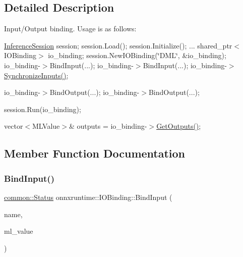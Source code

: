 \subsection{Detailed Description}
Input/\+Output binding. Usage is as follows\+:

\mbox{\hyperlink{classonnxruntime_1_1InferenceSession}{Inference\+Session}} session; session.\+Load(); session.\+Initialize(); ... shared\+\_\+ptr$<$\+I\+O\+Binding$>$ io\+\_\+binding; session.\+New\+I\+O\+Binding(\char`\"{}\+D\+M\+L\char`\"{}, \&io\+\_\+binding); io\+\_\+binding-\/$>$Bind\+Input(...); io\+\_\+binding-\/$>$Bind\+Input(...); io\+\_\+binding-\/$>$\mbox{\hyperlink{classonnxruntime_1_1IOBinding_a03022da7eb066502cae7288f13ef1625}{Synchronize\+Inputs()}};

io\+\_\+binding-\/$>$Bind\+Output(...); io\+\_\+binding-\/$>$Bind\+Output(...);

session.\+Run(io\+\_\+binding);

vector$<$\+M\+L\+Value$>$\& outputs = io\+\_\+binding-\/$>$\mbox{\hyperlink{classonnxruntime_1_1IOBinding_a2200c675c3fa6c3aa11de0847082fe33}{Get\+Outputs()}}; 

\subsection{Member Function Documentation}
\mbox{\label{classonnxruntime_1_1IOBinding_ac1217bbb8ec78b47ad58c343cdd15f7c}} 
\subsubsection{\texorpdfstring{Bind\+Input()}{BindInput()}}
{\footnotesize\ttfamily \mbox{\hyperlink{classonnxruntime_1_1common_1_1Status}{common\+::\+Status}} onnxruntime\+::\+I\+O\+Binding\+::\+Bind\+Input (\begin{DoxyParamCaption}\item[{const std\+::string \&}]{name,  }\item[{const \mbox{\hyperlink{classonnxruntime_1_1MLValue}{M\+L\+Value}} \&}]{ml\+\_\+value }\end{DoxyParamCaption})}

